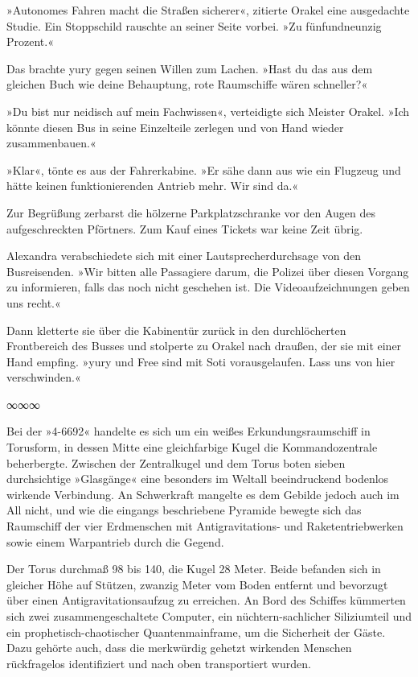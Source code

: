 »Autonomes Fahren macht die Straßen sicherer«, zitierte Orakel eine ausgedachte Studie. Ein Stoppschild rauschte an seiner Seite vorbei. »Zu fünfundneunzig Prozent.«

Das brachte yury gegen seinen Willen zum Lachen. »Hast du das aus dem gleichen Buch wie deine Behauptung, rote Raumschiffe wären schneller?«

»Du bist nur neidisch auf mein Fachwissen«, verteidigte sich Meister Orakel. »Ich könnte diesen Bus in seine Einzelteile zerlegen und von Hand wieder zusammenbauen.«

»Klar«, tönte es aus der Fahrerkabine. »Er sähe dann aus wie ein Flugzeug und hätte keinen funktionierenden Antrieb mehr. Wir sind da.«

Zur Begrüßung zerbarst die hölzerne Parkplatzschranke vor den Augen des aufgeschreckten Pförtners. Zum Kauf eines Tickets war keine Zeit übrig.

Alexandra verabschiedete sich mit einer Lautsprecherdurchsage von den Busreisenden. »Wir bitten alle Passagiere darum, die Polizei über diesen Vorgang zu informieren, falls das noch nicht geschehen ist. Die Videoaufzeichnungen geben uns recht.«

Dann kletterte sie über die Kabinentür zurück in den durchlöcherten Frontbereich des Busses und stolperte zu Orakel nach draußen, der sie mit einer Hand empfing. »yury und Free sind mit Soti vorausgelaufen. Lass uns von hier verschwinden.«

\begin{center}
∞∞∞
\end{center}

Bei der »4-6692« handelte es sich um ein weißes Erkundungsraumschiff in Torusform, in dessen Mitte eine gleichfarbige Kugel die Kommandozentrale beherbergte. Zwischen der Zentralkugel und dem Torus boten sieben durchsichtige »Glasgänge« eine besonders im Weltall beeindruckend bodenlos wirkende Verbindung. An Schwerkraft mangelte es dem Gebilde jedoch auch im All nicht, und wie die eingangs beschriebene Pyramide bewegte sich das Raumschiff der vier Erdmenschen mit Antigravitations- und Raketentriebwerken sowie einem Warpantrieb durch die Gegend.

Der Torus durchmaß 98 bis 140, die Kugel 28 Meter. Beide befanden sich in gleicher Höhe auf Stützen, zwanzig Meter vom Boden entfernt und bevorzugt über einen Antigravitationsaufzug zu erreichen. An Bord des Schiffes kümmerten sich zwei zusammengeschaltete Computer, ein nüchtern-sachlicher Siliziumteil und ein prophetisch-chaotischer Quantenmainframe, um die Sicherheit der Gäste. Dazu gehörte auch, dass die merkwürdig gehetzt wirkenden Menschen rückfragelos identifiziert und nach oben transportiert wurden.

